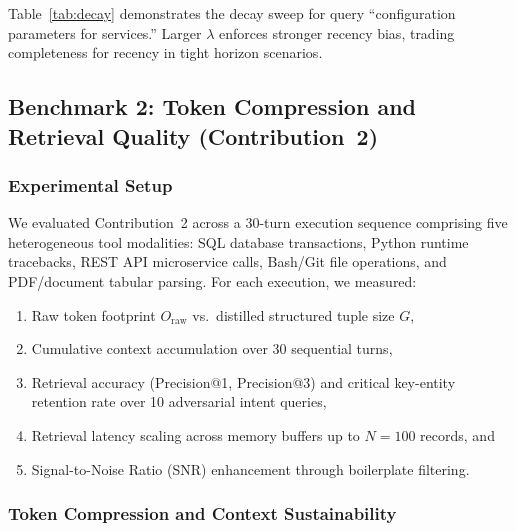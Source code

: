 \documentclass[lettersize,journal]{IEEEtran}
\begin{document}
Table~\ref{tab:decay} demonstrates the decay sweep for query ``configuration parameters for services.'' Larger $\lambda$ enforces stronger recency bias, trading completeness for recency in tight horizon scenarios.

\subsection{Benchmark 2: Token Compression and Retrieval Quality (Contribution~2)}

\subsubsection{Experimental Setup}
We evaluated Contribution~2 across a 30-turn execution sequence comprising five heterogeneous tool modalities: SQL database transactions, Python runtime tracebacks, REST API microservice calls, Bash/Git file operations, and PDF/document tabular parsing. For each execution, we measured:
\begin{enumerate}
    \item Raw token footprint $O_{\text{raw}}$ vs.\ distilled structured tuple size $G$,
    \item Cumulative context accumulation over 30 sequential turns,
    \item Retrieval accuracy (Precision@1, Precision@3) and critical key-entity retention rate over 10 adversarial intent queries,
    \item Retrieval latency scaling across memory buffers up to $N = 100$ records, and
    \item Signal-to-Noise Ratio (SNR) enhancement through boilerplate filtering.
\end{enumerate}

\subsubsection{Token Compression and Context Sustainability}
\end{document}
